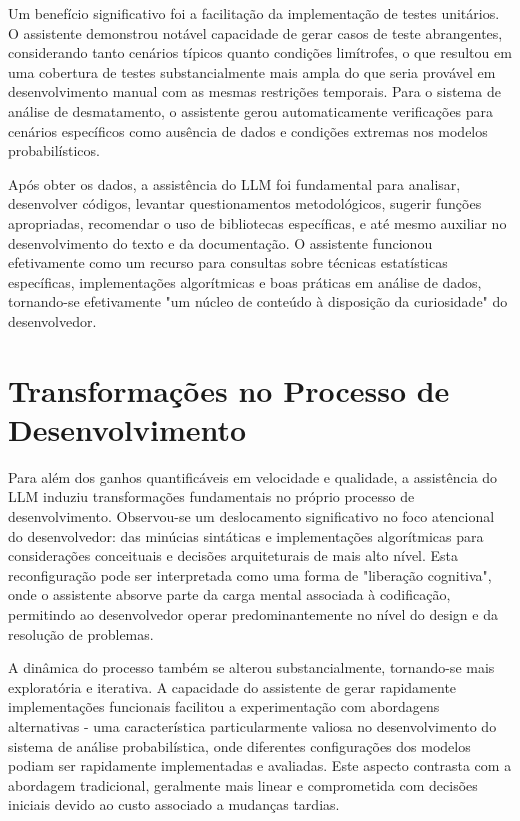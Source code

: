 \documentclass[12pt,a4paper]{article}
\begin{document}
Um benefício significativo foi a facilitação da implementação de testes unitários. O assistente demonstrou notável capacidade de gerar casos de teste abrangentes, considerando tanto cenários típicos quanto condições limítrofes, o que resultou em uma cobertura de testes substancialmente mais ampla do que seria provável em desenvolvimento manual com as mesmas restrições temporais. Para o sistema de análise de desmatamento, o assistente gerou automaticamente verificações para cenários específicos como ausência de dados e condições extremas nos modelos probabilísticos.

Após obter os dados, a assistência do LLM foi fundamental para analisar, desenvolver códigos, levantar questionamentos metodológicos, sugerir funções apropriadas, recomendar o uso de bibliotecas específicas, e até mesmo auxiliar no desenvolvimento do texto e da documentação. O assistente funcionou efetivamente como um recurso para consultas sobre técnicas estatísticas específicas, implementações algorítmicas e boas práticas em análise de dados, tornando-se efetivamente "um núcleo de conteúdo à disposição da curiosidade" do desenvolvedor.

\section{Transformações no Processo de Desenvolvimento}

Para além dos ganhos quantificáveis em velocidade e qualidade, a assistência do LLM induziu transformações fundamentais no próprio processo de desenvolvimento. Observou-se um deslocamento significativo no foco atencional do desenvolvedor: das minúcias sintáticas e implementações algorítmicas para considerações conceituais e decisões arquiteturais de mais alto nível. Esta reconfiguração pode ser interpretada como uma forma de "liberação cognitiva", onde o assistente absorve parte da carga mental associada à codificação, permitindo ao desenvolvedor operar predominantemente no nível do design e da resolução de problemas.

A dinâmica do processo também se alterou substancialmente, tornando-se mais exploratória e iterativa. A capacidade do assistente de gerar rapidamente implementações funcionais facilitou a experimentação com abordagens alternativas - uma característica particularmente valiosa no desenvolvimento do sistema de análise probabilística, onde diferentes configurações dos modelos podiam ser rapidamente implementadas e avaliadas. Este aspecto contrasta com a abordagem tradicional, geralmente mais linear e comprometida com decisões iniciais devido ao custo associado a mudanças tardias.
\end{document}
